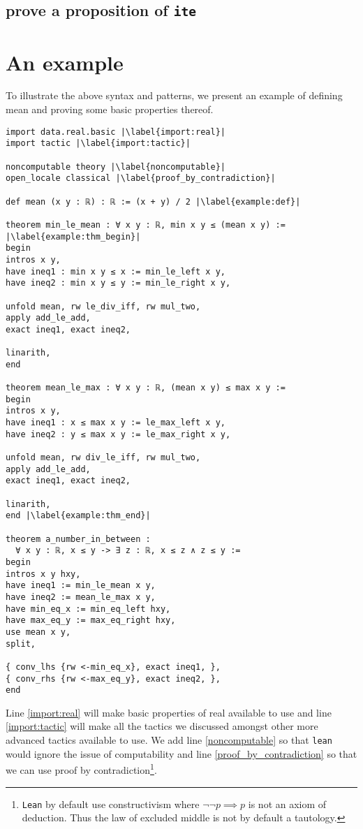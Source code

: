 \documentclass{report}
\theoremstyle{definition}
\theoremstyle{plain}
\begin{document}
\subsection{prove a proposition of {\tt ite}}


\section{An example}
To illustrate the above syntax and patterns, we present an example of defining mean and proving some basic properties thereof.

\begin{verbatim}
import data.real.basic |\label{import:real}|
import tactic |\label{import:tactic}|
  
noncomputable theory |\label{noncomputable}|
open_locale classical |\label{proof_by_contradiction}|  

def mean (x y : ℝ) : ℝ := (x + y) / 2 |\label{example:def}|
  
theorem min_le_mean : ∀ x y : ℝ, min x y ≤ (mean x y) := |\label{example:thm_begin}|
begin
intros x y,
have ineq1 : min x y ≤ x := min_le_left x y,
have ineq2 : min x y ≤ y := min_le_right x y,
    
unfold mean, rw le_div_iff, rw mul_two, 
apply add_le_add, 
exact ineq1, exact ineq2, 
  
linarith,
end
  
theorem mean_le_max : ∀ x y : ℝ, (mean x y) ≤ max x y :=
begin
intros x y,
have ineq1 : x ≤ max x y := le_max_left x y,
have ineq2 : y ≤ max x y := le_max_right x y,
  
unfold mean, rw div_le_iff, rw mul_two,
apply add_le_add,
exact ineq1, exact ineq2,
  
linarith,
end |\label{example:thm_end}|
  
theorem a_number_in_between : 
  ∀ x y : ℝ, x ≤ y -> ∃ z : ℝ, x ≤ z ∧ z ≤ y :=
begin
intros x y hxy,
have ineq1 := min_le_mean x y,
have ineq2 := mean_le_max x y,
have min_eq_x := min_eq_left hxy,
have max_eq_y := max_eq_right hxy,
use mean x y,
split,
  
{ conv_lhs {rw <-min_eq_x}, exact ineq1, },
{ conv_rhs {rw <-max_eq_y}, exact ineq2, },
end

\end{verbatim}

Line \ref{import:real} will make basic properties of real available to use and line \ref{import:tactic} will make all the tactics we discussed amongst other more advanced tactics available to use. We add line \ref{noncomputable} so that {\tt lean} would ignore the issue of computability and line \ref{proof_by_contradiction} so that we can use proof by contradiction\footnote{{\tt Lean} by default use constructivism where $\neg\neg p\implies p$ is not an axiom of deduction. Thus the law of excluded middle is not by default a tautology.}. 
\end{document}
